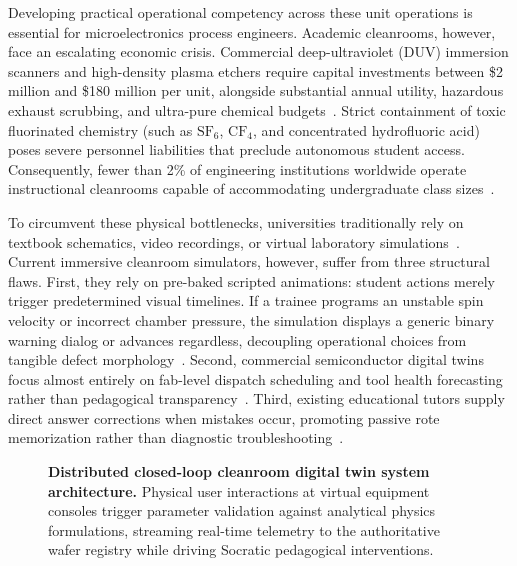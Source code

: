\documentclass[10pt,a4paper,twocolumn]{article}
\begin{document}
Developing practical operational competency across these unit operations is essential for microelectronics process engineers. Academic cleanrooms, however, face an escalating economic crisis. Commercial deep-ultraviolet (DUV) immersion scanners and high-density plasma etchers require capital investments between \$2 million and \$180 million per unit, alongside substantial annual utility, hazardous exhaust scrubbing, and ultra-pure chemical budgets~\cite{myung2025stwinner}. Strict containment of toxic fluorinated chemistry (such as $\text{SF}_6$, $\text{CF}_4$, and concentrated hydrofluoric acid) poses severe personnel liabilities that preclude autonomous student access. Consequently, fewer than 2\% of engineering institutions worldwide operate instructional cleanrooms capable of accommodating undergraduate class sizes~\cite{wang2024cleanroom}.

To circumvent these physical bottlenecks, universities traditionally rely on textbook schematics, video recordings, or virtual laboratory simulations~\cite{riaji2025enhancing,lampropoulos2024vr,muzata2024immersive}. Current immersive cleanroom simulators, however, suffer from three structural flaws. First, they rely on pre-baked scripted animations: student actions merely trigger predetermined visual timelines. If a trainee programs an unstable spin velocity or incorrect chamber pressure, the simulation displays a generic binary warning dialog or advances regardless, decoupling operational choices from tangible defect morphology~\cite{davis2024immersive,wang2024cleanroom}. Second, commercial semiconductor digital twins focus almost entirely on fab-level dispatch scheduling and tool health forecasting rather than pedagogical transparency~\cite{kuo2025deep,asad2023human,yildiz2021demonstration}. Third, existing educational tutors supply direct answer corrections when mistakes occur, promoting passive rote memorization rather than diagnostic troubleshooting~\cite{sunil2025socraticai,knievel2025aitee}.

\begin{figure}[!t]
\centering
{}
\caption{\textbf{Distributed closed-loop cleanroom digital twin system architecture.} Physical user interactions at virtual equipment consoles trigger parameter validation against analytical physics formulations, streaming real-time telemetry to the authoritative wafer registry while driving Socratic pedagogical interventions.}
\label{fig:architecture}
\end{figure}
\end{document}
